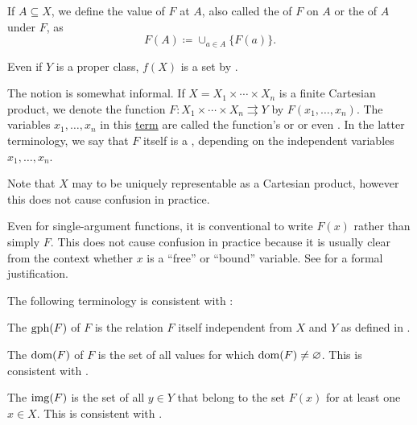 \begin{definition}
\begin{thmenum}[series=def:function]
     If \( A \subseteq X \), we define the value of \( F \) at \( A \), also called the  of \( F \) on \( A \) or the  of \( A \) under \( F \), as
    \begin{equation*}
      F(A) \coloneqq \cup_{a \in A} \{ F(a) \}.
    \end{equation*}

    Even if \( Y \) is a proper class, \( f(X) \) is a set by .

     The notion  is somewhat informal. If \( X = X_1 \times \cdots \times X_n \) is a finite Cartesian product, we denote the function \( F: X_1 \times \cdots \times X_n \rightrightarrows Y \) by \( F(x_1, \ldots, x_n) \). The variables \( x_1, \ldots, x_n \) in this \hyperref[def:first_order_syntax/term]{term} are called the function's  or  or even . In the latter terminology, we say that \( F \) itself is a , depending on the independent variables \( x_1, \ldots, x_n \).

    Note that \( X \) may to be uniquely representable as a Cartesian product, however this does not cause confusion in practice.

    Even for single-argument functions, it is conventional to write \( F(x) \) rather than simply \( F \). This does not cause confusion in practice because it is usually clear from the context whether \( x \) is a \enquote{free} or \enquote{bound} variable. See  for a formal justification.
  \end{thmenum}

  The following terminology is consistent with :
  \begin{thmenum}[resume=def:function]
     The  \( \operatorname{gph}(F) \) of \( F \) is the relation \( F \) itself independent from \( X \) and \( Y \) as defined in .

     The  \( \operatorname{dom}(F) \) of \( F \) is the set of all values for which \( \operatorname{dom}(F) \neq \varnothing \). This is consistent with .

     The  \( \operatorname{img}(F) \) is the set of all \( y \in Y \) that belong to the set \( F(x) \) for at least one \( x \in X \). This is consistent with .


\end{thmenum}
\end{definition}
